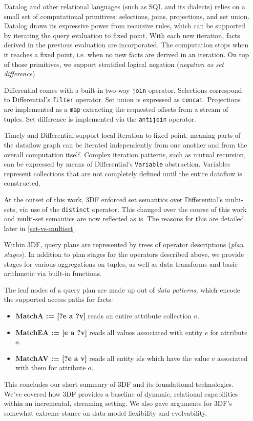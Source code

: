 \documentclass[../index.tex]{subfiles}
\begin{document}
Datalog and other relational languages (such as SQL and its dialects)
relies on a small set of computational primitives: selections, joins,
projections, and set union. Datalog draws its expressive power from
recursive rules, which can be supported by iterating the query
evaluation to fixed point. With each new iteration, facts derived in
the previous evaluation are incorporated. The computation stops when
it reaches a fixed point, i.e. when no new facts are derived in an
iteration. On top of those primitives, we support stratified logical
negation (\emph{negation as set difference}).

Differential comes with a built-in two-way \texttt{join}
operator. Selections correspond to Differential's \texttt{filter}
operator. Set union is expressed as \texttt{concat}. Projections are
implemented as a \texttt{map} extracting the requested offsets from a
stream of tuples. Set difference is implemented via the
\texttt{antijoin} operator.

Timely and Differential support local iteration to fixed point,
meaning parts of the dataflow graph can be iterated independently from
one another and from the overall computation itself. Complex iteration
patterns, such as mutual recursion, can be expressed by means of
Differential's \texttt{Variable} abstraction. Variables represent
collections that are not completely defined until the entire dataflow
is constructed.

At the outset of this work, 3DF enforced set semantics over
Differential's multi-sets, via use of the \texttt{distinct}
operator. This changed over the course of this work and multi-set
semantics are now reflected as is. The reasons for this are detailed
later in \autoref{set-vs-multiset}.

Within 3DF, query plans are represented by trees of operator
descriptions (\emph{plan stages}). In addition to plan stages for the
operators described above, we provide stages for various aggregations
on tuples, as well as data transforms and basic arithmetic via
built-in functions.

The leaf nodes of a query plan are made up out of \emph{data
  patterns}, which encode the supported access paths for facts:

\begin{itemize}
\item \textbf{MatchA := [?e a ?v]} reads an entire attribute
  collection $a$.
\item \textbf{MatchEA := [e a ?v]} reads all values associated with
  entity $e$ for attribute $a$.
\item \textbf{MatchAV := [?e a v]} reads all entity ids which have the
  value $v$ associated with them for attribute $a$.
\end{itemize}

This concludes our short summary of 3DF and its foundational
technologies. We've covered how 3DF provides a baseline of dynamic,
relational capabilities within an incremental, streaming setting. We
also gave arguments for 3DF's somewhat extreme stance on data model
flexibility and evolvability.
\end{document}
